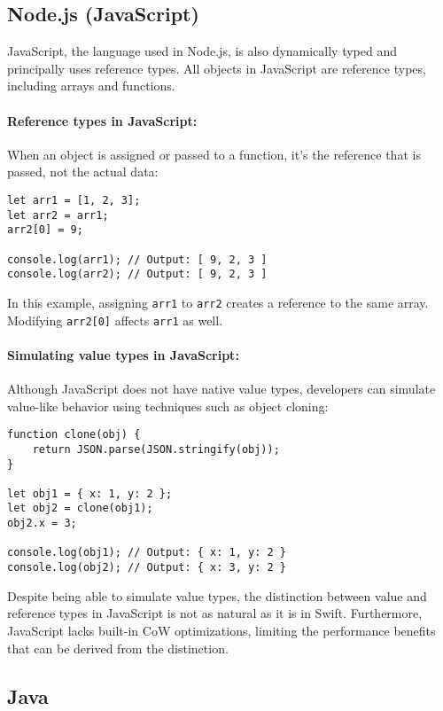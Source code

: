 \subsection{Node.js (JavaScript)}

JavaScript, the language used in Node.js, is also dynamically typed and principally uses reference types. All objects in JavaScript are reference types, including arrays and functions.

\paragraph{Reference types in JavaScript:}
When an object is assigned or passed to a function, it's the reference that is passed, not the actual data:

\begin{verbatim}
let arr1 = [1, 2, 3];
let arr2 = arr1;
arr2[0] = 9;

console.log(arr1); // Output: [ 9, 2, 3 ]
console.log(arr2); // Output: [ 9, 2, 3 ]
\end{verbatim}

In this example, assigning \texttt{arr1} to \texttt{arr2} creates a reference to the same array. Modifying \texttt{arr2[0]} affects \texttt{arr1} as well.

\paragraph{Simulating value types in JavaScript:}
Although JavaScript does not have native value types, developers can simulate value-like behavior using techniques such as object cloning:

\begin{verbatim}
function clone(obj) {
    return JSON.parse(JSON.stringify(obj));
}

let obj1 = { x: 1, y: 2 };
let obj2 = clone(obj1);
obj2.x = 3;

console.log(obj1); // Output: { x: 1, y: 2 }
console.log(obj2); // Output: { x: 3, y: 2 }
\end{verbatim}

Despite being able to simulate value types, the distinction between value and reference types in JavaScript is not as natural as it is in Swift. Furthermore, JavaScript lacks built-in CoW optimizations, limiting the performance benefits that can be derived from the distinction.

\subsection{Java}

